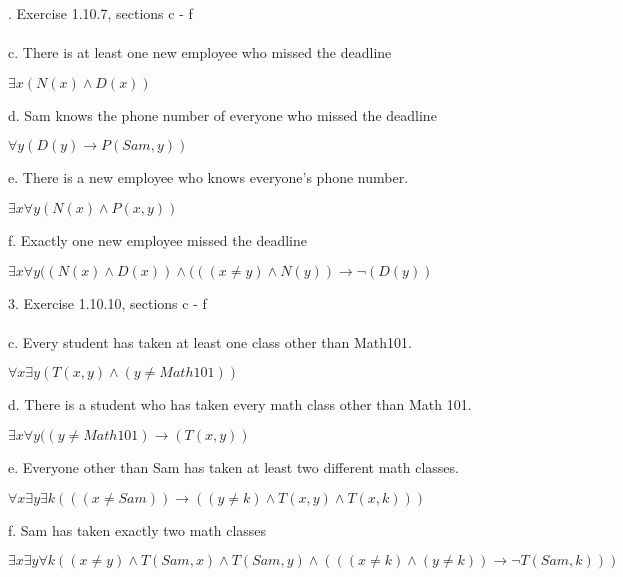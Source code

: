 \documentclass[11pt]{article}
\begin{document}
{. Exercise 1.10.7, sections c - f \\\\
c. There is at least one new employee who missed the deadline\\
\begin{center}
$\exists x(N(x) \wedge D(x))$
\end{center}
d. Sam knows the phone number of everyone who missed the deadline\\
\begin{center}
$\forall y( D(y) \rightarrow P(Sam, y))$
\end{center}
e. There is a new employee who knows everyone's phone number.\\
\begin{center}
$\exists x \forall y(N(x) \wedge P(x,y))$
\end{center}
f. Exactly one new employee missed the deadline\\
\begin{center}
$\exists x \forall y ((N(x) \wedge D(x)) \wedge (((x \not = y) \wedge N(y)) \rightarrow {\displaystyle \neg} (D(y))$
\end{center}
3. Exercise 1.10.10, sections c - f \\\\
c. Every student has taken at least one class other than Math101.\\
\begin{center}
$\forall x \exists y (T(x, y) \wedge (y \not = Math 101))$
\end{center}
d. There is a student who has taken every math class other than Math 101.\\
\begin{center}
$\exists x \forall y ((y \not = Math101) \rightarrow (T(x,y))$
\end{center}
e. Everyone other than Sam has taken at least two different math classes.\\
\begin{center}
$\forall x \exists y \exists k (((x \not = Sam)) \rightarrow ((y \not = k) \wedge T(x, y) \wedge T(x, k)))$ 
\end{center}
f. Sam has taken exactly two math classes\\
\begin{center}
$\exists x \exists y \forall k ((x \not = y) \wedge T(Sam, x) \wedge T(Sam, y) \wedge ((( x \not = k) \wedge  (y \not = k)) \rightarrow {\displaystyle \neg} T(Sam, k)))$
\end{center}
\pagebreak

}
\end{document}
